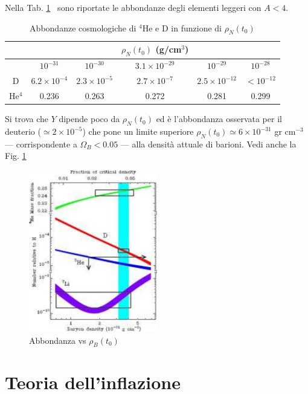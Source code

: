 Nella Tab. \ref{tab_abbondanze}~\parencite[555]{weinberg:gravitation} sono
riportate le abbondanze degli elementi leggeri con $A<4$.
\begin{table}
  \centering{}
  \caption{Abbondanze cosmologiche di $^4$He e D in funzione di $\rho_N(t_0)$}
  \label{tab_abbondanze}
  \begin{tabular}{cccccc}
    \toprule
           &                     &                     & $\rho_N(t_0)$ (g/cm$^{3}$) &                      &              \\
    \midrule
           & $10^{-31}         $ & $ 10^{-30}        $ & $3.1\times 10^{-29}$       & $ 10^{-29}         $ & $10^{-28}$   \\
    \midrule
    D      & $6.2\times 10^{-4}$ & $2.3\times 10^{-5}$ & $2.7\times 10^{-7} $       & $2.5\times 10^{-12}$ & $ <10^{-12}$ \\
    He$^4$ & 0.236               & 0.263               & 0.272                      & 0.281                & 0.299        \\
    \bottomrule
  \end{tabular}
\end{table}
Si trova che $Y$ dipende poco da $\rho_N(t_0)$ ed è l'abbondanza osservata per
il deuterio ($\simeq 2 \times 10^{-5}$) che pone un limite superiore
$\rho_N(t_0) \simeq 6 \times 10^{-31}$ gr cm$^{-3}$ --- corrispondente a
$\Omega_B <0.05$ --- alla densità attuale di barioni. Vedi anche la
Fig. \ref{fig:abbondanza}
\begin{figure}
  \centering{}
  \includegraphics[width=0.5\textwidth]{figure/Abundances.pdf}
  \caption{Abbondanza vs $\rho_B(t_0)$}
  \label{fig:abbondanza}
\end{figure}

\section{Teoria dell'inflazione}
\label{sec:inflazione}


